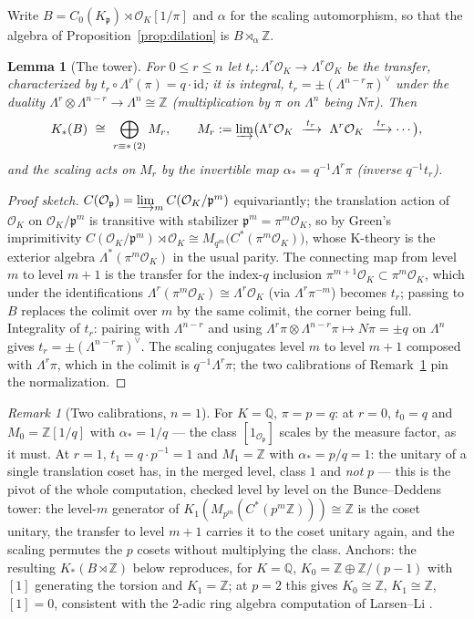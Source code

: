 \documentclass[11pt]{amsart}
\newtheorem{lemma}[theorem]{Lemma}
\theoremstyle{remark}
\newtheorem{remark}[theorem]{Remark}
\newcommand{\OK}{\mathcal{O}_K}
\newcommand{\Op}{\mathcal{O}_\pp}
\newcommand{\pp}{\mathfrak{p}}
\newcommand{\Z}{\mathbb{Z}}
\newcommand{\Q}{\mathbb{Q}}
\newcommand{\Ns}{N}
\begin{document}
Write $B=C_0(K_\pp)\rtimes\OK[1/\pi]$ and $\alpha$ for the scaling automorphism, so that
the algebra of Proposition~\ref{prop:dilation} is $B\rtimes_\alpha\Z$.

\begin{lemma}[The tower]\label{lem:tower}
For $0\le r\le n$ let $t_r:\Lambda^r\OK\to\Lambda^r\OK$ be the transfer, characterized by
$t_r\circ\Lambda^r(\pi)=q\cdot\mathrm{id}$; it is integral,
$t_r=\pm(\Lambda^{n-r}\pi)^\vee$ under the duality $\Lambda^r\otimes\Lambda^{n-r}\to
\Lambda^n\cong\Z$ (multiplication by $\pi$ on $\Lambda^n$ being $\Ns\pi$). Then
\[
K_*(B)\ \cong\ \bigoplus_{r\equiv *\,(2)}M_r,\qquad
M_r:=\varinjlim\bigl(\Lambda^r\OK\ \xrightarrow{\,t_r\,}\ \Lambda^r\OK\
\xrightarrow{\,t_r\,}\cdots\bigr),
\]
and the scaling acts on $M_r$ by the invertible map $\alpha_*=q^{-1}\Lambda^r\pi$
(inverse $q^{-1}t_r$).
\end{lemma}

\begin{proof}[Proof sketch]
$C(\Op)=\varinjlim_mC(\OK/\pp^m)$ equivariantly; the translation action of $\OK$ on
$\OK/\pp^m$ is transitive with stabilizer $\pp^m=\pi^m\OK$, so by Green's imprimitivity
$C(\OK/\pp^m)\rtimes\OK\cong M_{q^m}\bigl(C^*(\pi^m\OK)\bigr)$, whose K-theory is the
exterior algebra $\Lambda^*(\pi^m\OK)$ in the usual parity. The connecting map from level
$m$ to level $m{+}1$ is the transfer for the index-$q$ inclusion
$\pi^{m+1}\OK\subset\pi^m\OK$, which under the identifications
$\Lambda^r(\pi^m\OK)\cong\Lambda^r\OK$ (via $\Lambda^r\pi^{-m}$) becomes $t_r$; passing to
$B$ replaces the colimit over $m$ by the same colimit, the corner being full.
Integrality of $t_r$: pairing with $\Lambda^{n-r}$ and using
$\Lambda^r\pi\otimes\Lambda^{n-r}\pi\mapsto\Ns\pi=\pm q$ on $\Lambda^n$ gives
$t_r=\pm(\Lambda^{n-r}\pi)^\vee$. The scaling conjugates level $m$ to level $m{+}1$
composed with $\Lambda^r\pi$, which in the colimit is $q^{-1}\Lambda^r\pi$; the two
calibrations of Remark~\ref{rem:calibration} pin the normalization.
\end{proof}

\begin{remark}[Two calibrations, $n=1$]\label{rem:calibration}
For $K=\Q$, $\pi=p=q$: at $r=0$, $t_0=q$ and $M_0=\Z[1/q]$ with $\alpha_*=1/q$ ---
the class $[1_{\Op}]$ scales by the measure factor, as it must. At $r=1$, $t_1=q\cdot
p^{-1}=1$ and $M_1=\Z$ with $\alpha_*=p/q=1$: the unitary of a single translation coset
has, in the merged level, class $1$ and \emph{not} $p$ --- this is the pivot of the whole
computation, checked level by level on the Bunce--Deddens tower: the level-$m$ generator
of $K_1(M_{p^m}(C^*(p^m\Z)))\cong\Z$ is the coset unitary, the transfer to level $m{+}1$
carries it to the coset unitary again, and the scaling permutes the $p$ cosets without
multiplying the class. Anchors: the resulting $K_*(B\rtimes\Z)$ below reproduces, for
$K=\Q$, $K_0=\Z\oplus\Z/(p-1)$ with $[1]$ generating the torsion and $K_1=\Z$; at $p=2$
this gives $K_0\cong\Z$, $K_1\cong\Z$, $[1]=0$, consistent with the $2$-adic ring algebra
computation of Larsen--Li \cite{LarsenLi}.
\end{remark}
\end{document}
